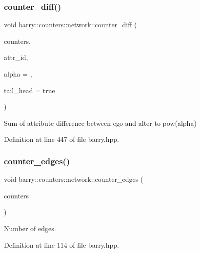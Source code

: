 \subsubsection{\texorpdfstring{counter\+\_\+diff()}{counter\_diff()}}
{\footnotesize\ttfamily void barry\+::counters\+::network\+::counter\+\_\+diff (\begin{DoxyParamCaption}\item[{\hyperlink{namespacebarry_1_1counters_1_1network_aa72fdb34752ac24167a06ee196a8fff6}{Net\+Counters} $\ast$}]{counters,  }\item[{\hyperlink{namespacebarry_a11dfc53ddb4672278319aa04f1e09a6c}{uint}}]{attr\+\_\+id,  }\item[{double}]{alpha = {},  }\item[{double}]{tail\+\_\+head = {\ttfamily true} }\end{DoxyParamCaption})\hspace{0.3cm}{\ttfamily [inline]}}



Sum of attribute difference between ego and alter to pow(alpha) 



Definition at line 447 of file barry.\+hpp.

\mbox{\label{namespacebarry_1_1counters_1_1network_ace52a65ee587dfe7b5e815de70350581}} 
\subsubsection{\texorpdfstring{counter\+\_\+edges()}{counter\_edges()}}
{\footnotesize\ttfamily void barry\+::counters\+::network\+::counter\+\_\+edges (\begin{DoxyParamCaption}\item[{\hyperlink{namespacebarry_1_1counters_1_1network_aa72fdb34752ac24167a06ee196a8fff6}{Net\+Counters} $\ast$}]{counters }\end{DoxyParamCaption})\hspace{0.3cm}{\ttfamily [inline]}}



Number of edges. 



Definition at line 114 of file barry.\+hpp.

